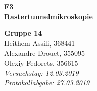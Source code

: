 


	
\begin{titlepage}
	\thispagestyle{empty}
	
%
%
%
	
	\hspace{0pt}
	\vspace{2cm}
	\begin{center}
		\hdashrule{\linewidth}{1pt}{}
		\vskip -0.5cm
		\hdashrule{\linewidth}{0.5pt}{}
		
		\vspace{0.5cm}
		\Huge{ \textbf{ F3 \\}}
		\LARGE{ \textbf{Rastertunnelmikroskopie} } 
		
		\hdashrule{\linewidth}{0.5pt}{}
		\vskip -0.95cm
		\hdashrule{\linewidth}{1pt}{}
		
		\vspace{3cm}
		\Large{\textbf{ Gruppe 14 \\}}
		\Large{Heithem Assili, 368441 \\ Alexandre Drouet, 355095 \\ Olexiy Fedorets, 356615 \\}
		\vspace{1cm}
		\Large{\textsl{ Versuchstag: 12.03.2019 \\ Protokollabgabe: 27.03.2019}}

		

		
	\end{center}
	\vfill
	
\end{titlepage}
	
	
	
\skippage
{}
\thispagestyle{plain}

